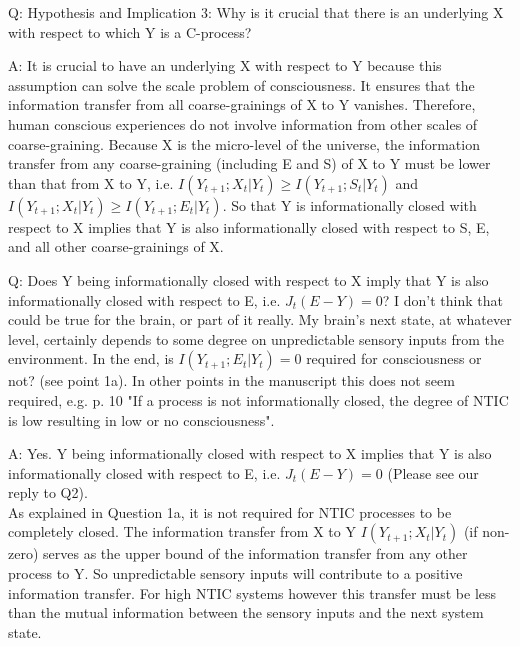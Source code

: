 \documentclass[utf8]{article}
\newcounter{cQuestion}[section]
\newenvironment{question}
    {\refstepcounter{cQuestion}\color{Blue}\noindent\newline Q\thecQuestion:}
    {~\newline}
\newenvironment{ans}  
    {\color{Black}\noindent A:}
    {~\newline}
\begin{document}
       
        
        \begin{question}
            Hypothesis and Implication 3: Why is it crucial that there is an underlying X with respect to which Y is a C-process?     
        \end{question}
        
        \begin{ans}        	
            It is crucial to have an underlying X with respect to Y because this assumption can solve the scale problem of consciousness. It ensures that the information transfer from all coarse-grainings of X to Y vanishes. Therefore, human conscious experiences do not involve information from other scales of coarse-graining. 
            Because X is the micro-level of the universe, the information transfer from any coarse-graining (including E and S) of X  to Y must be lower than that from X to Y, i.e. $I(Y_{t+1}; X_t|Y_t) \geq I(Y_{t+1}; S_t|Y_t)$ and $I(Y_{t+1}; X_t|Y_t) \geq I(Y_{t+1}; E_t|Y_t)$. So that Y is informationally closed with respect to X implies that Y is also informationally closed with respect to S, E, and all other coarse-grainings of X.
        \end{ans}
        
        \begin{question}
            Does Y being informationally closed with respect to X imply that Y is also informationally closed with respect to E, i.e. $J_t(E-Y) = 0$? I don't think that could be true for the brain, or part of it really. My brain's next state, at whatever level, certainly depends to some degree on unpredictable sensory inputs from the environment. In the end, is $I(Y_{t+1}; E_t|Y_t) = 0$ required for consciousness or not? (see point 1a). In other points in the manuscript this does not seem required, e.g. p. 10 "If a process is not informationally closed, the degree of NTIC is low resulting in low or no consciousness".    
        \end{question}
        
        \begin{ans}
            Yes. Y being informationally closed with respect to X implies that Y is also informationally closed with respect to E, i.e. $J_t(E-Y) = 0$ (Please see our reply to Q2).\\
            As explained in Question 1a, it is not required for NTIC processes to be completely closed. The information transfer from X to Y $I(Y_{t+1}; X_t|Y_t)$ (if non-zero) serves as the upper bound of the information transfer from any other process to Y. So unpredictable sensory inputs will contribute to a positive information transfer. For high NTIC systems however this transfer must be less than the mutual information between the sensory inputs and the next system state.        
        \end{ans}
        
\end{document}
